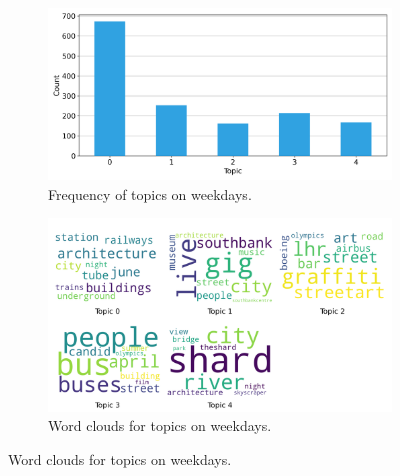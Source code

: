 \documentclass{article}
\theoremstyle{definition}
\theoremstyle{remark}
\begin{document}
\begin{figure}[!h]
    \centering
    \begin{subfigure}{0.45\textwidth}
        \centering
        \includegraphics[width=\linewidth]{figures/places_sense_weekday_locals.png} 
        \caption{Frequency of topics on weekdays.}
        \label{fig:places_sense_weekday_locals}
    \end{subfigure}
    \hfill
    \begin{subfigure}{0.5\textwidth}
        \centering
        \includegraphics[width=\linewidth]{figures/topics_weekday_locals.png} 
        \caption{Word clouds for topics on weekdays.}
        \label{fig:topics_weekday_locals}
    \end{subfigure}


\end{figure}
\end{document}
